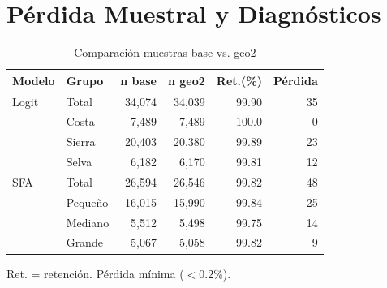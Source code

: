 \documentclass[11pt,a4paper]{article}
\begin{document}
\section{Pérdida Muestral y Diagnósticos}

\begin{table}[H]
\centering
\caption{Comparación muestras base vs. geo2}
\label{tab:sample_loss}
\begin{threeparttable}
\small
\begin{tabular}{llrrrr}
\toprule
\textbf{Modelo} & \textbf{Grupo} & \textbf{n base} & \textbf{n geo2} & \textbf{Ret.(\%)} & \textbf{Pérdida} \\
\midrule
Logit & Total & 34,074 & 34,039 & 99.90 & 35 \\
& Costa & 7,489 & 7,489 & 100.0 & 0 \\
& Sierra & 20,403 & 20,380 & 99.89 & 23 \\
& Selva & 6,182 & 6,170 & 99.81 & 12 \\
\midrule
SFA & Total & 26,594 & 26,546 & 99.82 & 48 \\
& Pequeño & 16,015 & 15,990 & 99.84 & 25 \\
& Mediano & 5,512 & 5,498 & 99.75 & 14 \\
& Grande & 5,067 & 5,058 & 99.82 & 9 \\
\bottomrule
\end{tabular}
\begin{tablenotes}
\footnotesize
\item Ret. = retención. Pérdida mínima ($<$0.2\%).
\end{tablenotes}
\end{threeparttable}
\end{table}
\end{document}
